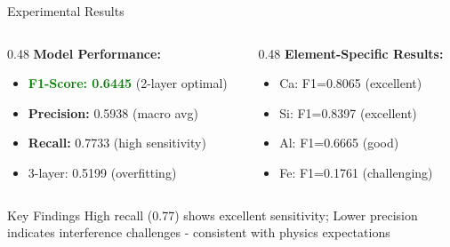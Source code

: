 \documentclass{beamer}
\begin{document}
\begin{frame}{Experimental Results}
  \begin{columns}[T]
    \begin{column}{0.48\textwidth}
      \textbf{Model Performance:}
      \begin{itemize}
        \item \textcolor{green}{\textbf{F1-Score: 0.6445}} (2-layer optimal)
        \item \textbf{Precision:} 0.5938 (macro avg)
        \item \textbf{Recall:} 0.7733 (high sensitivity)
        \item 3-layer: 0.5199 (overfitting)
      \end{itemize}
    \end{column}
    \begin{column}{0.48\textwidth}
      \textbf{Element-Specific Results:}
      \begin{itemize}
        \item Ca: F1=0.8065 (excellent)
        \item Si: F1=0.8397 (excellent)
        \item Al: F1=0.6665 (good)
        \item Fe: F1=0.1761 (challenging)
      \end{itemize}
    \end{column}
  \end{columns}
  
  \vspace{1em}
  
  \begin{block}{Key Findings}
    High recall (0.77) shows excellent sensitivity; Lower precision indicates interference challenges - consistent with physics expectations
  \end{block}
\end{frame}
\end{document}
